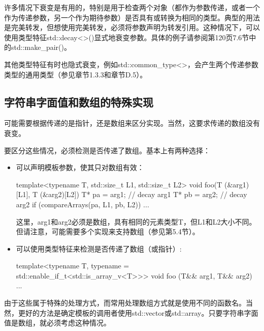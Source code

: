 许多情况下衰变是有用的，特别是用于检查两个对象（都作为参数传递，或者一个作为传递参数，另一个作为期待参数）是否具有或转换为相同的类型。典型的用法是完美转发，但想使用完美转发，必须将参数声明为转发引用。这种情况下，可以使用类型特征std::decay<>()显式地衰变参数。具体的例子请参阅第120页7.6节中的std::make\_pair()。

其他类型特征有时也隐式衰变，例如std::common\_type<>，会产生两个传递参数类型的通用类型（参见章节1.3.3和章节D.5）。

\subsection{字符串字面值和数组的特殊实现}

可能需要根据传递的是指针，还是数组来区分实现。当然，这要求传递的数组没有衰变。

要区分这些情况，必须检测是否传递了数组。基本上有两种选择：

\begin{itemize}
\item 
可以声明模板参数，使其只对数组有效：

\begin{cpp}
template<typename T, std::size_t L1, std::size_t L2>
void foo(T (&arg1)[L1], T (&arg2)[L2]) {
	T* pa = arg1; // decay arg1
	T* pb = arg2; // decay arg2
	if (compareArrays(pa, L1, pb, L2)) {
		...
	}
}
\end{cpp}

这里，arg1和arg2必须是数组，具有相同的元素类型T，但L1和L2大小不同。但请注意，可能需要多个实现来支持数组（参见第5.4节）。

\item 
可以使用类型特征来检测是否传递了数组（或指针）:

\begin{cpp}
template<typename T,
		 typename = std::enable_if_t<std::is_array_v<T>>>
void foo (T&& arg1, T&& arg2) {
	...
}
\end{cpp}
\end{itemize}

由于这些属于特殊的处理方式，而常用处理数组方式就是使用不同的函数名。当然，更好的方法是确定模板的调用者使用std::vector或std::array。只要字符串字面值是数组，就必须考虑这种情况。


















